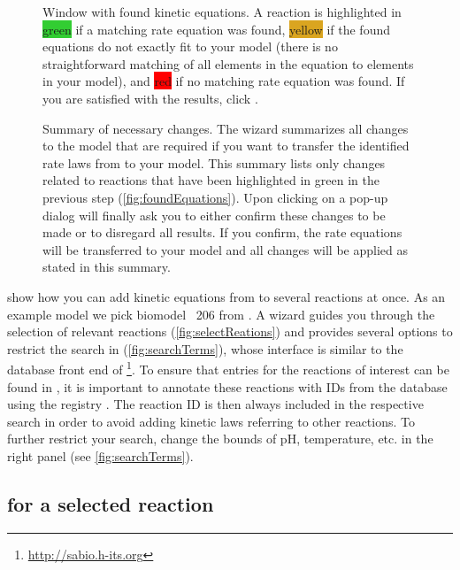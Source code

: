 \begin{figure}[b!]
\caption[Window with kinetic equations found for all reactions]{Window with found kinetic equations.
A reaction is highlighted in \colorbox{LimeGreen}{green} if a matching rate equation was found, \colorbox{Goldenrod}{yellow} if the found equations do not exactly fit to your model (there is no straightforward matching of all elements in the equation to elements in your model), and \colorbox{red}{red} if no matching rate equation was found.
If you are satisfied with the results, click .}
\label{fig:foundEquations}
\end{figure}
\begin{figure}[t!]
\caption[Summary of necessary changes]{Summary of necessary changes.
The wizard summarizes all changes to the model that are required if you want to transfer the identified rate laws from \SABIO to your model.
This summary lists only changes related to reactions that have been highlighted in green in the previous step (\vref{fig:foundEquations}).
Upon clicking on  a pop-up dialog will finally ask you to either confirm these changes to be made or to disregard all results.
If you confirm, the rate equations will be transferred to your model and all changes will be applied as stated in this summary.}
\label{fig:changes}
\end{figure}
 show how you can add kinetic equations from \SABIO to several reactions at once.
As an example model we pick biomodel \numero~206 from \BioModels \citep{Li2010a, Wolf2000}.
A wizard guides you through the selection of relevant reactions (\vref{fig:selectReations}) and provides several options to restrict the search in \SABIO (\vref{fig:searchTerms}), whose interface is similar to the database front end of \SABIO\footnote{\url{http://sabio.h-its.org}}.
To ensure that entries for the reactions of interest can be found in \SABIO, it is important to annotate these reactions with \acp{ID} from the \KEGG database \citep{Kanehisa2000a} using the \MIRIAM registry \citep{Juty2012}.
The \KEGG reaction \ac{ID} is then always included in the respective search in order to avoid adding kinetic laws referring to other reactions.
To further restrict your search, change the bounds of pH, temperature, etc. in the right panel (see \vref{fig:searchTerms}).

\subsection{\SABIO for a selected reaction}

